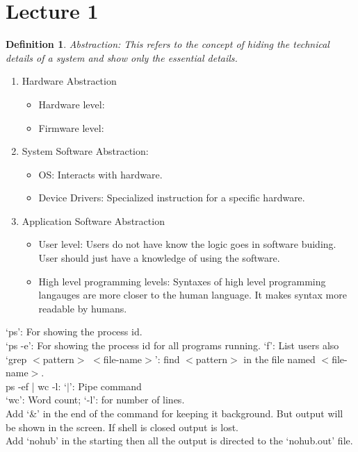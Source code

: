 \documentclass[12pt]{report}
\title{
\author{Devansh Tripathi\\ Lecturer: Prof. K. Santhesh Kumar}
}
\newtheorem{defn}{Definition}
\begin{document}
\maketitle

\section*{Lecture 1}
\begin{defn}
    Abstraction: This refers to the concept of hiding the technical details of a system and show only the essential details.
\end{defn}
\begin{enumerate}
    \item Hardware Abstraction
    \begin{itemize}
        \item Hardware level:
        \item Firmware level:
    \end{itemize}
    \item System Software Abstraction:
    \begin{itemize}
        \item OS: Interacts with hardware.
        \item Device Drivers: Specialized instruction for a specific hardware.
    \end{itemize}  
    \item Application Software Abstraction
    \begin{itemize}
        \item User level: Users do not have know the logic goes in software buiding. User should just have a knowledge of using the software. 
        \item High level programming levels: Syntaxes of high level programming langauges are more closer to the human language. It makes syntax more readable by humans.
    \end{itemize}
\end{enumerate}
`ps': For showing the process id.\\
`ps -e': For showing the process id for all programs running. `f': List users also\\
`grep $<$pattern$>$ $<$file-name$>$': find $<$pattern$>$ in the file named $<$file-name$>$.\\
ps -ef | wc -l: `$\mid$': Pipe command\\
`wc': Word count; `-l': for number of lines.\\
Add `\&' in the end of the command for keeping it background. But output will be shown in the screen. If shell is closed output is lost. \\
Add `nohub' in the starting then all the output is directed to the `nohub.out' file.\\ 
\end{document}
